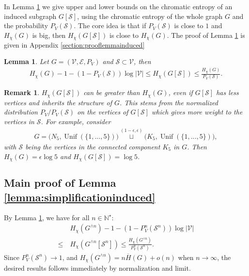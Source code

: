\documentclass[conference,a4paper]{IEEEtran}
\DeclareMathOperator*{\Unif}{Unif}
\newtheorem{lemma}{Lemma}
\newtheorem{remark}[theorem]{Remark}
\begin{document}
In Lemma \ref{lemma:induced} we give upper and lower bounds on the chromatic entropy of an induced subgraph $G[\mathcal{S}]$, using the chromatic entropy of the whole graph $G$ and the probability $P_V(\mathcal{S})$. The core idea is that if $P_V(\mathcal{S})$ is close to $1$ and $H_\chi(G)$ is big, then $H_\chi(G[\mathcal{S}])$ is close to $H_\chi(G)$. The proof of Lemma \ref{lemma:induced} is given in Appendix \ref{section:prooflemmainduced}

\begin{lemma}\label{lemma:induced}
        Let $G = (\mathcal{V}, \mathcal{E}, P_V)$ and $\mathcal{S} \subset \mathcal{V}$, then 
        \begin{align}
            H_\chi(G) - 1 - (1-P_V(\mathcal{S}))\log|\mathcal{V}| \leq H_\chi(G[\mathcal{S}]) \leq\frac{H_\chi(G)}{P_V(\mathcal{S})}.
        \end{align}
\end{lemma}

\begin{remark}
    $H_\chi(G[\mathcal{S}])$ can be greater than $H_\chi(G)$, even if $G[\mathcal{S}]$ has less vertices and inherits the structure of $G$. This stems from the normalized distribution $P_V/P_V(\mathcal{S})$ on the vertices of $G[\mathcal{S}]$ which gives more weight to the vertices in $\mathcal{S}$. For example, consider
    \begin{align}
        G = \big(N_5, \Unif(\lbrace 1, ..., 5\rbrace)\big) \overset{(1-\epsilon,\epsilon)}{\sqcup} \big(K_5, \Unif(\lbrace 1, ..., 5\rbrace)\big),\nonumber
    \end{align}
    with $\mathcal{S}$ being the vertices in the connected component $K_5$ in $G$. Then $H_\chi(G) = \epsilon \log 5$ and $H_\chi(G[\mathcal{S}]) = \log 5$.
\end{remark}



\subsection{Main proof of Lemma \ref{lemma:simplificationinduced}}

By Lemma \ref{lemma:induced}, we have for all $n \in \mathbb{N}^\star$:
\begin{align}
    & H_\chi(G^{\wedge n}) - 1 - (1-P^n_V(\mathcal{S}^n))\log|\mathcal{V}| \nonumber\\
    \leq \: & H_\chi(G^{\wedge n}[\mathcal{S}^n]) \leq \frac{H_\chi(G^{\wedge n})}{P^n_V(\mathcal{S}^n)}.
\end{align}
Since $P^n_V(\mathcal{S}^n) \rightarrow 1$, and $H_\chi(G^{\wedge n}) = n \overline{H}(G) + o(n)$ when $n \rightarrow \infty$, the desired results follows immediately by normalization and limit.
\end{document}
